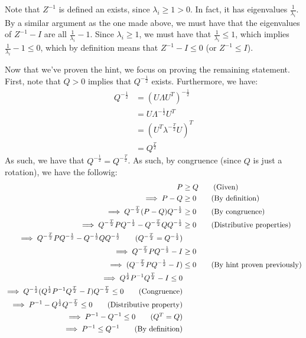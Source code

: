 \documentclass[12pt]{exam}
\begin{document}
\begin{questions}
\begin{solution}
\begin{enumerate}[label=(\alph*)]
        Note that $Z^{-1}$ is defined an exists, since $\lambda_i \geq 1 > 0$. In fact, it has eigenvalues $\frac{1}{\lambda_i}$. By a similar argument as the one made above, we must have that the eigenvalues of $Z^{-1} - I$ are all $\frac{1}{\lambda_i} - 1$. Since $\lambda_i \geq 1$, we must have that $\frac{1}{\lambda_i} \leq 1$, which implies $\frac{1}{\lambda_i} - 1 \leq 0$, which by definition means that $Z^{-1} - I \leq 0$ (or $Z^{-1} \leq I$).

        Now that we've proven the hint, we focus on proving the remaining statement. First, note that $Q > 0$ implies that $Q^{-\frac{1}{2}}$ exists. Furthermore, we have:
        \begin{align*}
          Q^{-\frac{1}{2}} &= (U\Lambda U^T)^{-\frac{1}{2}} \tag{$Q$ is a symetric matrix} \\
          &= U\Lambda^{-\frac{1}{2}}U^T \tag{Properties of diagonilization} \\
          &= (U^T\lambda^{-\frac{T}{2}}U)^T \tag{Transposing twice} \\
          &= Q^{\frac{T}{2}}
        \end{align*}
        As such, we have that $Q^{-\frac{1}{2}} = Q^{-\frac{T}{2}}$. As such, by congruence (since $Q$ is just a rotation), we have the followig:
        \begin{align*}
          P &\geq Q \tag{Given} \\
          \implies P - Q &\geq 0 \tag{By definition} \\
          \implies Q^{-\frac{T}{2}}(P - Q)Q^{-\frac{1}{2}} & \geq 0 \tag{By congruence} \\
          \implies Q^{-\frac{T}{2}}PQ^{-\frac{1}{2}} - Q^{-\frac{T}{2}}QQ^{-\frac{1}{2}} & \geq 0 \tag{Distributive properties} \\
          \implies Q^{-\frac{T}{2}}PQ^{-\frac{1}{2}} - Q^{-\frac{1}{2}}QQ^{-\frac{1}{2}} \tag{$Q^{-\frac{T}{2}} = Q^{-\frac{1}{2}}$} \\
          \implies Q^{-\frac{T}{2}}PQ^{-\frac{1}{2}} - I &\geq 0 \\
          \implies (Q^{-\frac{T}{2}}PQ^{-\frac{1}{2}} - I) &\leq 0 \tag{By hint proven previously} \\
          \implies Q^{\frac{1}{2}}P^{-1}Q^{\frac{T}{2}} - I \leq 0 \\
          \implies Q^{-\frac{1}{2}}(Q^{\frac{1}{2}}P^{-1}Q^{\frac{T}{2}} - I)Q^{-\frac{T}{2}} \leq 0 \tag{Congruence} \\
          \implies P^{-1} - Q^{\frac{1}{2}}Q^{-\frac{T}{2}} \leq 0 \tag{Distributive property} \\
          \implies P^{-1} - Q^{-1} \leq 0 \tag{$Q^{T} = Q$} \\
          \implies P^{-1} \leq Q^{-1} \tag{By definition}
        \end{align*}



\end{enumerate}
\end{solution}
\end{questions}
\end{document}
